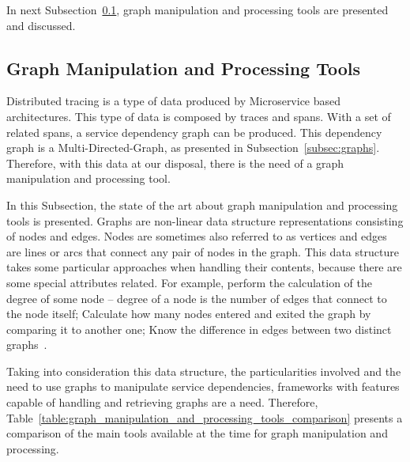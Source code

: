 In next Subsection~\ref{subsec:graph_manipulation_and_processing_tools}, graph manipulation and processing tools are presented and discussed.

\subsection{Graph Manipulation and Processing Tools}
\label{subsec:graph_manipulation_and_processing_tools}

Distributed tracing is a type of data produced by Microservice based architectures. This type of data is composed by traces and spans. With a set of related spans, a service dependency graph can be produced. This dependency graph is a Multi-Directed-Graph, as presented in Subsection~\ref{subsec:graphs}. Therefore, with this data at our disposal, there is the need of a graph manipulation and processing tool.

In this Subsection, the state of the art about graph manipulation and processing tools is presented. Graphs are non-linear data structure representations consisting of nodes and edges. Nodes are sometimes also referred to as vertices and edges are lines or arcs that connect any pair of nodes in the graph. This data structure takes some particular approaches when handling their contents, because there are some special attributes related. For example, perform the calculation of the degree of some node -- degree of a node is the number of edges that connect to the node itself; Calculate how many nodes entered and exited the graph by comparing it to another one; Know the difference in edges between two distinct graphs~\cite{Trudeau1993}.

Taking into consideration this data structure, the particularities involved and the need to use graphs to manipulate service dependencies, frameworks with features capable of handling and retrieving graphs are a need. Therefore, Table~\ref{table:graph_manipulation_and_processing_tools_comparison} presents a comparison of the main tools available at the time for graph manipulation and processing.

